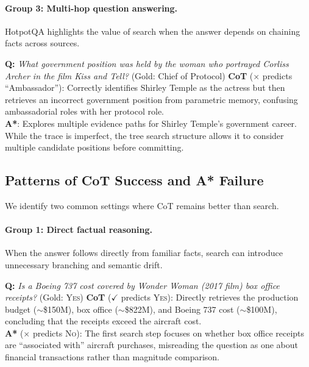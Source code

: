 \documentclass[10pt]{article}
\begin{document}
\paragraph{Group 3: Multi-hop question answering.}
HotpotQA highlights the value of search when the answer depends on chaining facts across sources.

\begin{examplebox}[title=HotpotQA --- Multi-hop Chaining]
\textbf{Q:} \emph{What government position was held by the woman who portrayed Corliss Archer in the film \textit{Kiss and Tell}?} \quad (Gold: Chief of Protocol)
\tcblower
\textbf{CoT} ($\times$ predicts ``Ambassador''): Correctly identifies Shirley Temple as the actress but then retrieves an incorrect government position from parametric memory, confusing ambassadorial roles with her protocol role.\\[4pt]
\textbf{A*}: Explores multiple evidence paths for Shirley Temple's government career. While the trace is imperfect, the tree search structure allows it to consider multiple candidate positions before committing.
\end{examplebox}

\subsection{Patterns of CoT Success and A* Failure}
\label{app:cot_success}

We identify two common settings where CoT remains better than search.

\paragraph{Group 1: Direct factual reasoning.}
When the answer follows directly from familiar facts, search can introduce unnecessary branching and semantic drift.

\begin{examplebox}[title=StrategyQA --- Direct Factual Reasoning]
\textbf{Q:} \emph{Is a Boeing 737 cost covered by \textit{Wonder Woman} (2017 film) box office receipts?} \quad (Gold: \textsc{Yes})
\tcblower
\textbf{CoT} ($\checkmark$ predicts \textsc{Yes}): Directly retrieves the production budget ($\sim$\$150M), box office ($\sim$\$822M), and Boeing 737 cost ($\sim$\$100M), concluding that the receipts exceed the aircraft cost.\\[4pt]
\textbf{A*} ($\times$ predicts \textsc{No}): The first search step focuses on whether box office receipts are ``associated with'' aircraft purchases, misreading the question as one about financial transactions rather than magnitude comparison.
\end{examplebox}
\end{document}
